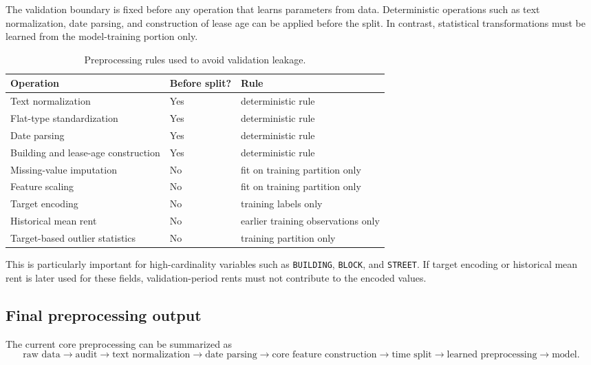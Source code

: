 \documentclass[10pt]{article}
\begin{document}
The validation boundary is fixed before any operation that learns parameters from data.
Deterministic operations such as text normalization, date parsing, and construction of lease age can be applied before the split.
In contrast, statistical transformations must be learned from the model-training portion only.

\begin{table}[h]
\centering
\small
\begin{tabular}{lll}
\toprule
Operation & Before split? & Rule \\
\midrule
Text normalization & Yes & deterministic rule \\
Flat-type standardization & Yes & deterministic rule \\
Date parsing & Yes & deterministic rule \\
Building and lease-age construction & Yes & deterministic rule \\
Missing-value imputation & No & fit on training partition only \\
Feature scaling & No & fit on training partition only \\
Target encoding & No & training labels only \\
Historical mean rent & No & earlier training observations only \\
Target-based outlier statistics & No & training partition only \\
\bottomrule
\end{tabular}
\caption{Preprocessing rules used to avoid validation leakage.}
\label{tab:preprocessing-leakage}
\end{table}

This is particularly important for high-cardinality variables such as
\texttt{BUILDING},
\texttt{BLOCK},
and \texttt{STREET}.
If target encoding or historical mean rent is later used for these fields, validation-period rents must not contribute to the encoded values.

\subsection{Final preprocessing output}

The current core preprocessing can be summarized as
\begin{equation}
\text{raw data}
\rightarrow
\text{audit}
\rightarrow
\text{text normalization}
\rightarrow
\text{date parsing}
\rightarrow
\text{core feature construction}
\rightarrow
\text{time split}
\rightarrow
\text{learned preprocessing}
\rightarrow
\text{model}.
\end{equation}
\end{document}
